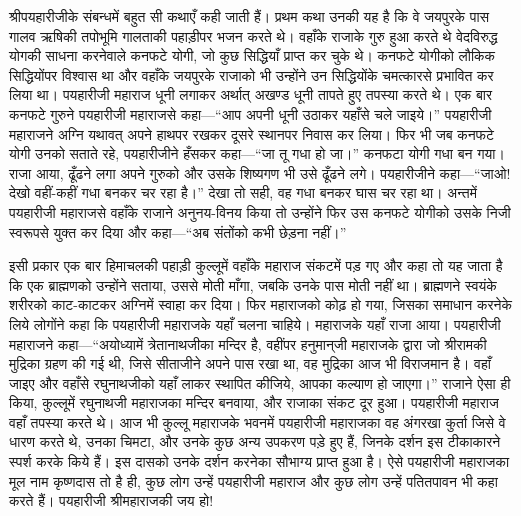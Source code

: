\begin{sloppypar}\justifying{}
श्रीपयहारीजीके संबन्धमें बहुत सी कथाएँ कही जाती हैं। प्रथम कथा उनकी यह है कि वे जयपुरके पास गालव ऋषिकी तपोभूमि गालताकी पहाड़ीपर भजन करते थे। वहाँके राजाके गुरु हुआ करते थे वेदविरुद्ध योगकी साधना करनेवाले कनफटे योगी, जो कुछ सिद्धियाँ प्राप्त कर चुके थे। कनफटे योगीको लौकिक सिद्धियोंपर विश्वास था और वहाँके जयपुरके राजाको भी उन्होंने उन सिद्धियोंके चमत्कारसे प्रभावित कर लिया था। पयहारीजी महाराज धूनी लगाकर अर्थात् अखण्ड धूनी तापते हुए तपस्या करते थे। एक बार कनफटे गुरुने पयहारीजी महाराजसे कहा—“आप अपनी धूनी उठाकर यहाँसे चले जाइये।” पयहारीजी महाराजने अग्नि यथावत् अपने हाथपर रखकर दूसरे स्थानपर निवास कर लिया। फिर भी जब कनफटे योगी उनको सताते रहे, पयहारीजीने हँसकर कहा—“जा तू गधा हो जा।” कनफटा योगी गधा बन गया। राजा आया, ढूँढने लगा अपने गुरुको और उसके शिष्यगण भी उसे ढूँढने लगे। पयहारीजीने कहा—“जाओ! देखो वहीं-कहीं गधा बनकर चर रहा है।” देखा तो सही, वह गधा बनकर घास चर रहा था। अन्तमें पयहारीजी महाराजसे वहाँके राजाने अनुनय-विनय किया तो उन्होंने फिर उस कनफटे योगीको उसके निजी स्वरूपसे युक्त कर दिया और कहा—“अब संतोंको कभी छेड़ना नहीं।”
\end{sloppypar}
\begin{sloppypar}\justifying{}
इसी प्रकार एक बार हिमाचलकी पहाड़ी कुल्लूमें वहाँके महाराज संकटमें पड़ गए और कहा तो यह जाता है कि एक ब्राह्मणको उन्होंने सताया, उससे मोती माँगा, जबकि उनके पास मोती नहीं था। ब्राह्मणने स्वयंके शरीरको काट-काटकर अग्निमें स्वाहा कर दिया। फिर महाराजको कोढ़ हो गया, जिसका समाधान करनेके लिये लोगोंने कहा कि पयहारीजी महाराजके यहाँ चलना चाहिये। महाराजके यहाँ राजा आया। पयहारीजी महाराजने कहा—“अयोध्यामें त्रेतानाथजीका मन्दिर है, वहींपर हनुमान्‌जी महाराजके द्वारा जो श्रीरामकी मुद्रिका ग्रहण की गई थी, जिसे सीताजीने अपने पास रखा था, वह मुद्रिका आज भी विराजमान है। वहाँ जाइए और वहाँसे रघुनाथजीको यहाँ लाकर स्थापित कीजिये, आपका कल्याण हो जाएगा।” राजाने ऐसा ही किया, कुल्लूमें रघुनाथजी महाराजका मन्दिर बनवाया, और राजाका संकट दूर हुआ। पयहारीजी महाराज वहाँ तपस्या करते थे। आज भी कुल्लू महाराजके भवनमें पयहारीजी महाराजका वह अंगरखा कुर्ता जिसे वे धारण करते थे, उनका चिमटा, और उनके कुछ अन्य उपकरण पड़े हुए हैं, जिनके दर्शन इस टीकाकारने स्पर्श करके किये हैं। इस दासको उनके दर्शन करनेका सौभाग्य प्राप्त हुआ है। ऐसे पयहारीजी महाराजका मूल नाम कृष्णदास तो है ही, कुछ लोग उन्हें पयहारीजी महाराज और कुछ लोग उन्हें पतितपावन भी कहा करते हैं। पयहारीजी श्रीमहाराजकी जय हो!
\end{sloppypar}


